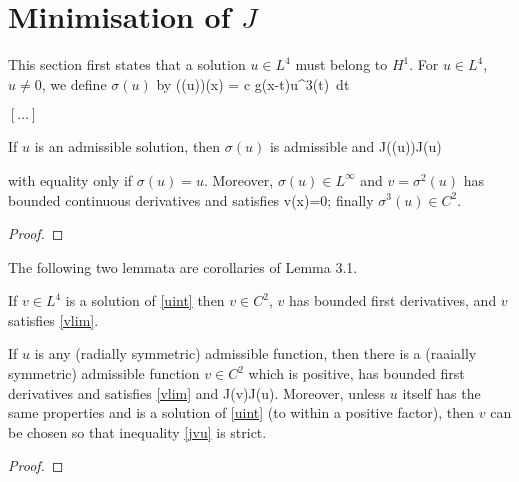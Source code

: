 \section{Minimisation of $J$}
This section first states that a solution $u\in L^4$ must belong to $H^1$.
For $u\in L^4$, $u\neq 0$, we define $\sigma(u)$ by 
\be \label{sigmadef} \left(\sigma(u)\right)(x) = c \int g(x-t)u^3(t)~dt \ee

$[\ldots]$

\begin{lemma} 
If $u$ is an admissible solution, then $\sigma(u)$ is admissible and
\be\label{jsigma}
J(\sigma(u))\leq J(u)
\ee

with equality only if $\sigma(u) = u$. Moreover, $\sigma(u)\in L^\infty$ 
and $v=\sigma^2(u)$ has bounded continuous derivatives and satisfies
\be\label{vlim}
 v(x)=0;
\ee
finally $\sigma^3(u)\in C^2$.
\end{lemma}
\begin{proof}
\end{proof}

The following two lemmata are corollaries of Lemma 3.1.
\begin{lemma} 
    If $v\in L^4$ is a solution of \eqref{uint} then $v\in C^2$, $v$ has
    bounded first derivatives, and $v$ satisfies \eqref{vlim}.
\end{lemma}
\begin{lemma} 
    If $u$ is any (radially symmetric) admissible function, then there is a
    (raaially symmetric) admissible function $v\in C^2$ which is positive, has
    bounded first derivatives and satisfies \eqref{vlim} and 
\be\label{jvu}
J(v)\leq J(u).
\ee
    Moreover, unless $u$ itself has the same properties and is a solution of 
    \eqref{uint} (to within a positive factor), then $v$ can be chosen so that
    inequality \eqref{jvu} is strict.
\end{lemma}
\begin{proof}
\end{proof}

% 
% 

